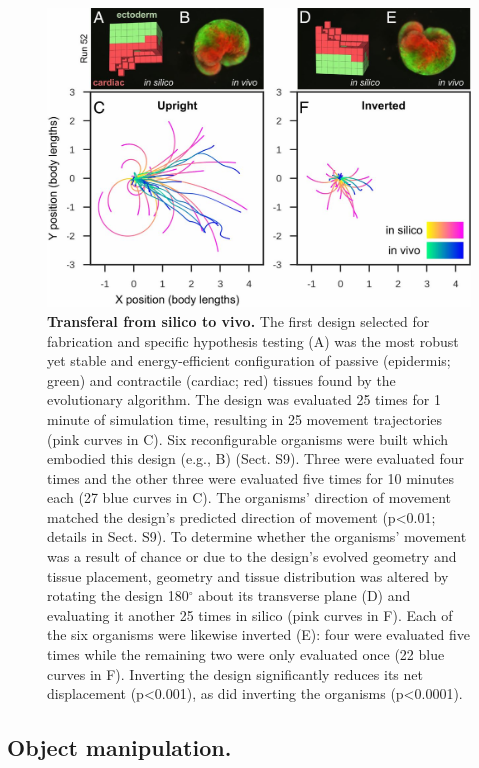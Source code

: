 \begin{figure}[!ht]
\centering
\includegraphics[width=\linewidth]{Chapter07/img/F4.large.jpg}
\caption{\textbf{Transferal from silico to vivo.} The first design selected for fabrication and specific hypothesis testing (A) was the most robust yet stable and energy-efficient configuration of passive (epidermis; green) and contractile (cardiac; red) tissues found by the evolutionary algorithm. The design was evaluated 25 times for 1 minute of simulation time, resulting in 25 movement trajectories (pink curves in C). Six reconfigurable organisms were built which embodied this design (e.g., B) (Sect. S9). Three were evaluated four times and the other three were evaluated five times for 10 minutes each (27 blue curves in C). The organisms' direction of movement matched the design's predicted direction of movement (p<0.01; details in Sect. S9). To determine whether the organisms' movement was a result of chance or due to the design's evolved geometry and tissue placement, geometry and tissue distribution was altered by rotating the design 180{$^{\circ}$} about its transverse plane (D) and evaluating it another 25 times in silico (pink curves in F). Each of the six organisms were likewise inverted (E): four were evaluated five times while the remaining two were only evaluated once (22 blue curves in F). Inverting the design significantly reduces its net displacement (p<0.001), as did inverting the organisms (p<0.0001).}
\end{figure}




\subsection*{Object manipulation.}  

